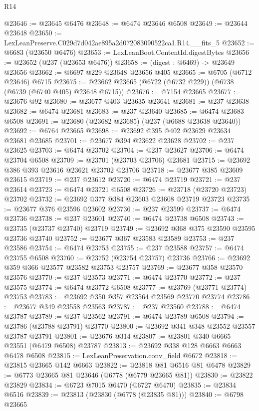\begin{lexlean}{R14}
\begin{coremodule}
@23646 := @23645 @6476
@23648 := @6474 @23646 @6508
@23649 := @23644 @23648
@23650 := LexLeanPreserve.C029d7d042ae895a2d072083090522ca1.R14.__fits_5
@23652 := @6683 (@23650 @6476)
@23653 := LexLeanBoot.ContentId.digestBytes
@23656 := @23652 (@237 (@23653 @6476))
@23658 := (digest : @6469) -> @23649 @23656
@23662 := @6697 @229 @23648 @23656 @405
@23665 := @6705 (@6712 @23646) @6715
@23675 := @23662 @23665 (@6722 (@6732 @229)) (@6738 (@6739 (@6740 @405) @23648 @6715))
@23676 := @7154 @23665
@23677 := @23676 @92
@23680 := @23677 @403 @23635 @23641
@23681 := @237 @23638
@23682 := @6474 @23681
@23683 := @237 @23640
@23685 := @6474 @23683 @6508
@23691 := @23680 (@23682 @23685) (@237 (@6688 @23638 @23640))
@23692 := @6764 @23665
@23698 := @23692 @395 @402 @23629 @23634 @23681 @23685
@23701 := @23677 @394 @23622 @23628
@23702 := @237 @23625
@23703 := @6474 @23702
@23704 := @237 @23627
@23706 := @6474 @23704 @6508
@23709 := @23701 (@23703 @23706) @23681
@23715 := @23692 @386 @393 @23616 @23621 @23702 @23706
@23718 := @23677 @385 @23609 @23615
@23719 := @237 @23612
@23720 := @6474 @23719
@23721 := @237 @23614
@23723 := @6474 @23721 @6508
@23726 := @23718 (@23720 @23723) @23702
@23732 := @23692 @377 @384 @23603 @23608 @23719 @23723
@23735 := @23677 @376 @23596 @23602
@23736 := @237 @23599
@23737 := @6474 @23736
@23738 := @237 @23601
@23740 := @6474 @23738 @6508
@23743 := @23735 (@23737 @23740) @23719
@23749 := @23692 @368 @375 @23590 @23595 @23736 @23740
@23752 := @23677 @367 @23583 @23589
@23753 := @237 @23586
@23754 := @6474 @23753
@23755 := @237 @23588
@23757 := @6474 @23755 @6508
@23760 := @23752 (@23754 @23757) @23736
@23766 := @23692 @359 @366 @23577 @23582 @23753 @23757
@23769 := @23677 @358 @23570 @23576
@23770 := @237 @23573
@23771 := @6474 @23770
@23772 := @237 @23575
@23774 := @6474 @23772 @6508
@23777 := @23769 (@23771 @23774) @23753
@23783 := @23692 @350 @357 @23564 @23569 @23770 @23774
@23786 := @23677 @349 @23558 @23563
@23787 := @237 @23560
@23788 := @6474 @23787
@23789 := @237 @23562
@23791 := @6474 @23789 @6508
@23794 := @23786 (@23788 @23791) @23770
@23800 := @23692 @341 @348 @23552 @23557 @23787 @23791
@23801 := @23676 @314
@23807 := @23801 @340 @6665 @23551 (@6479 @6508) @23787
@23813 := @23692 @338 @128 @6663 @6663 @6478 @6508
@23815 := LexLeanPreservation.conv_field @6672
@23818 := @23815 @23665 @142 @6663
@23822 := @23818 @81 @6516 @81 @6478
@23829 := @6773 @23665 @81 @23646 (@6778 (@6779 @23665 @81))
@23830 := @23822 @23829
@23834 := @6723 @7015 @6470 (@6727 @6470)
@23835 := @23834 @6516
@23839 := @23813 (@23830 (@6778 (@23835 @81)))
@23840 := @6798 @23665

\end{coremodule}
\end{lexlean}
